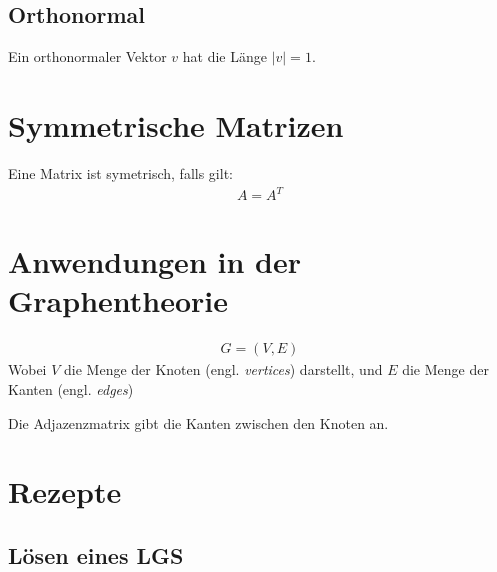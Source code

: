 \documentclass{scrartcl}
\begin{document}
\subsection{Orthonormal}

\begin{Def}
    Ein orthonormaler Vektor $v$ hat die Länge $|v| = 1$.
\end{Def}

\newpage
\section{Symmetrische Matrizen}

\begin{Def}
Eine Matrix ist symetrisch, falls gilt:
\begin{align*}
A = A^T
\end{align*}
\end{Def}

\newpage
\section{Anwendungen in der Graphentheorie}

\begin{Def}
    \begin{align*}
        G = (V, E)
    \end{align*}
    Wobei $V$ die Menge der Knoten (engl. \textit{vertices}) darstellt, und $E$ die Menge der Kanten (engl. \textit{edges})
\end{Def}

\begin{Def}[Adjazenzmatrix]
    Die Adjazenzmatrix gibt die Kanten zwischen den Knoten an.
\end{Def}

\newpage
\section{Rezepte}
\label{Rezepte}

\subsection{Lösen eines LGS}
\end{document}
